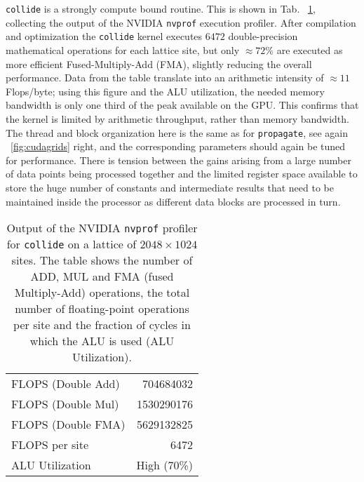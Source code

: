 \documentclass{elsarticle}
\newcommand{\bc}{\begin{center}}
\newcommand{\ec}{\end{center}}
\begin{document}
{\tt collide} is a strongly compute bound routine. This is shown in Tab. 
~\ref{nvprof:tab}, collecting the output of the NVIDIA {\tt nvprof} 
execution profiler. 
After compilation and optimization the {\tt collide} kernel executes 
$6472$ double-precision mathematical operations for each lattice site, 
but only $\approx 72\%$ are executed as more efficient Fused-Multiply-Add (FMA), 
slightly reducing the overall performance. 
%
Data from the table translate into an arithmetic intensity of $\approx 11$ 
Flops/byte; using this figure and the ALU utilization, the needed memory 
bandwidth is only one third of the peak available on the GPU. This confirms 
that the kernel is limited by arithmetic throughput, rather than memory bandwidth. 
%
%
The thread and block organization here is the same as for {\tt propagate}, 
see again \figurename~\ref{fig:cudagrids} right, 
and the corresponding parameters should again be tuned for performance. 
There is tension between the gains arising from a large number of data 
points being processed together and the limited register space available 
to store the huge number of constants and intermediate results that need 
to be maintained inside the processor as different data blocks are processed 
in turn.
%
\begin{table}
\centering
\caption{\label{nvprof:tab} Output of the NVIDIA {\tt nvprof} profiler
for {\tt collide} on a lattice of $2048 \times 1024$ sites. 
The table shows the number of ADD, MUL and FMA (fused Multiply-Add) 
operations, the total number of floating-point operations per site 
and the fraction of cycles in which the ALU is used (ALU Utilization).}
%
\begin{tabular}{lr}
\toprule
FLOPS (Double Add) &  704684032  \\
FLOPS (Double Mul) & 1530290176  \\
FLOPS (Double FMA) & 5629132825  \\
\midrule
FLOPS per site     &      6472   \\
\midrule
ALU Utilization    & High (70\%) \\
\bottomrule
\end{tabular}
%
\end{table}
\end{document}
